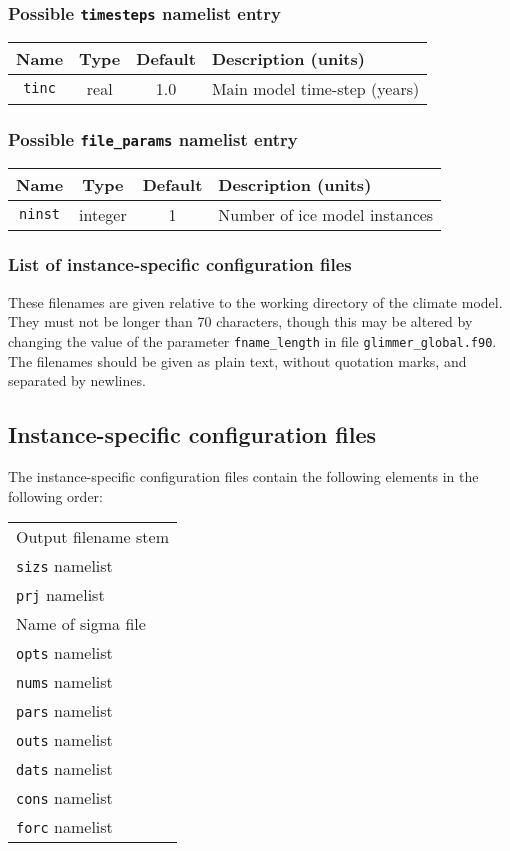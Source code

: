 \documentclass[11pt]{article}
\begin{document}
\subsubsection {Possible \texttt{timesteps} namelist entry}
%
\begin{center}
\begin{tabular}{|c|c|c|l|}
\hline
Name & Type & Default & Description (units) \\
\hline
\hline
\texttt{tinc} & real & 1.0 & Main model time-step (years) \\
\hline
\end{tabular}
\end{center}
%
\subsubsection{Possible \texttt{file\_params} namelist entry}
\begin{center}
\begin{tabular}{|c|c|c|l|}
\hline
Name & Type & Default & Description (units) \\
\hline
\hline
\texttt{ninst} & integer & 1 & Number of ice model instances \\
\hline 
\end{tabular}
\end{center}
%
\subsubsection{List of instance-specific configuration files}
%
These filenames are given relative to the working directory of the climate
model. They must not be longer than 70 characters, though this may be altered
by changing the value of the parameter \texttt{fname\_length} in file
\texttt{glimmer\_global.f90}. The filenames should be given as plain text,
without quotation marks, and separated by newlines. 
%
\subsection{Instance-specific configuration files}
%
The instance-specific configuration files contain the following elements in
the following order:
\begin{center}
\begin{tabular}{l}
Output filename stem \\
\texttt{sizs} namelist \\
\texttt{prj} namelist \\
Name of sigma file \\
\texttt{opts} namelist \\
\texttt{nums} namelist \\
\texttt{pars} namelist \\
\texttt{outs} namelist \\
\texttt{dats} namelist \\
\texttt{cons} namelist \\
\texttt{forc} namelist \\
\end{tabular}
\end{center}
%
\end{document}
